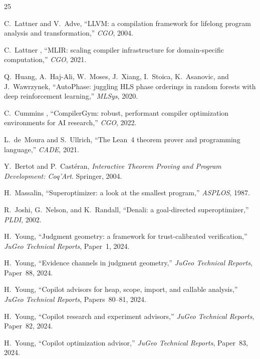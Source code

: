 \documentclass[11pt]{article}
\begin{document}
\begin{thebibliography}{25}

C.~Lattner and V.~Adve,
``LLVM: a compilation framework for lifelong program analysis
and transformation,''
\emph{CGO}, 2004.

C.~Lattner \etal{},
``MLIR: scaling compiler infrastructure for domain-specific
computation,''
\emph{CGO}, 2021.

Q.~Huang, A.~Haj-Ali, W.~Moses, J.~Xiang, I.~Stoica,
K.~Asanovic, and J.~Wawrzynek,
``AutoPhase: juggling HLS phase orderings in random forests
with deep reinforcement learning,''
\emph{MLSys}, 2020.

C.~Cummins \etal{},
``CompilerGym: robust, performant compiler optimization
environments for AI research,''
\emph{CGO}, 2022.

L.~de~Moura and S.~Ullrich,
``The Lean~4 theorem prover and programming language,''
\emph{CADE}, 2021.

Y.~Bertot and P.~Cast\'{e}ran,
\emph{Interactive Theorem Proving and Program Development:
Coq'Art}.
Springer, 2004.

H.~Massalin,
``Superoptimizer: a look at the smallest program,''
\emph{ASPLOS}, 1987.

R.~Joshi, G.~Nelson, and K.~Randall,
``Denali: a goal-directed superoptimizer,''
\emph{PLDI}, 2002.

H.~Young,
``Judgment geometry: a framework for trust-calibrated
verification,''
\emph{JuGeo Technical Reports}, Paper~1, 2024.

H.~Young,
``Evidence channels in judgment geometry,''
\emph{JuGeo Technical Reports}, Paper~88, 2024.

H.~Young,
``Copilot advisors for heap, scope, import, and callable
analysis,''
\emph{JuGeo Technical Reports}, Papers~80--81, 2024.

H.~Young,
``Copilot research and experiment advisors,''
\emph{JuGeo Technical Reports}, Paper~82, 2024.

H.~Young,
``Copilot optimization advisor,''
\emph{JuGeo Technical Reports}, Paper~83, 2024.


\end{thebibliography}
\end{document}
